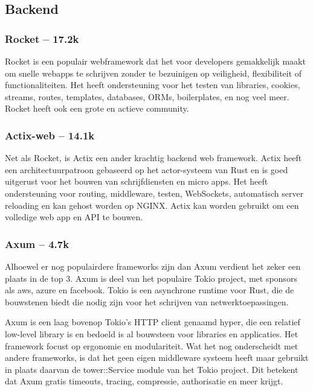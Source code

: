 \subsection{Backend}

\subsubsection{Rocket – 17.2k}

Rocket is een populair webframework dat het voor developers gemakkelijk maakt om snelle webapps te
schrijven zonder te bezuinigen op veiligheid, flexibiliteit of functionaliteiten. Het heeft
ondersteuning voor het testen van libraries, cookies, streams, routes, templates, databases, ORMs,
boilerplates, en nog veel meer. Rocket heeft ook een grote en actieve community. 

\subsubsection{Actix-web – 14.1k}

Net als Rocket, is Actix een ander krachtig backend web framework. Actix heeft een
architectuurpatroon gebaseerd op het actor-systeem van Rust en is goed uitgerust voor het bouwen van
schrijfdiensten en micro apps. Het heeft ondersteuning voor routing, middleware, testen, WebSockets,
automatisch server reloading en kan gehost worden op NGINX. Actix kan worden gebruikt om een
volledige web app en API te bouwen. 

\subsubsection{Axum – 4.7k}

Alhoewel er nog populairdere frameworks zijn dan Axum verdient het zeker een plaats in de top 3.
Axum is deel van het populaire Tokio project, met sponsors als aws, azure en facebook. Tokio is een
asynchrone runtime voor Rust, die de bouwstenen biedt die nodig zijn voor het schrijven van
netwerktoepassingen. 

Axum is een laag bovenop Tokio’s HTTP client genaamd hyper, die een relatief low-level library is en
bedoeld is al bouwsteen voor libraries en applicaties. Het framework focust op ergonomie en
modulariteit. Wat het nog onderscheidt met andere frameworks, is dat het geen eigen middleware
systeem heeft maar gebruikt in plaats daarvan de tower::Service module van het Tokio project. Dit
betekent dat Axum gratis timeouts, tracing, compressie, authorisatie en meer krijgt. 

